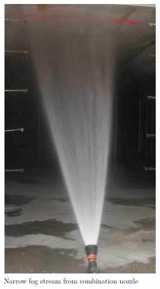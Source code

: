 \documentclass[12pt,oneside]{book}
\begin{document}
\begin{figure}[!ht]
	\begin{subfigure}[b]{0.45\columnwidth}
		\centering
		\includegraphics[width=0.75\columnwidth]{../Figures/Pictures/NF_example}
		\caption{Narrow fog stream from combination nozzle}
	\end{subfigure}
	\begin{subfigure}[b]{0.45\columnwidth}
		\centering

\end{subfigure}
\end{figure}
\end{document}
